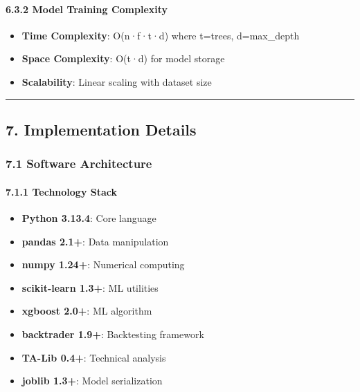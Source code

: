 \paragraph{6.3.2 Model Training
Complexity}\label{model-training-complexity}

\begin{itemize}
\tightlist
\item
  \textbf{Time Complexity}: O(n·f·t·d) where t=trees, d=max\_depth
\item
  \textbf{Space Complexity}: O(t·d) for model storage
\item
  \textbf{Scalability}: Linear scaling with dataset size
\end{itemize}

\begin{center}\rule{0.5\linewidth}{0.5pt}\end{center}

\subsection{7. Implementation Details}\label{implementation-details}

\subsubsection{7.1 Software Architecture}\label{software-architecture}

\paragraph{7.1.1 Technology Stack}\label{technology-stack}

\begin{itemize}
\tightlist
\item
  \textbf{Python 3.13.4}: Core language
\item
  \textbf{pandas 2.1+}: Data manipulation
\item
  \textbf{numpy 1.24+}: Numerical computing
\item
  \textbf{scikit-learn 1.3+}: ML utilities
\item
  \textbf{xgboost 2.0+}: ML algorithm
\item
  \textbf{backtrader 1.9+}: Backtesting framework
\item
  \textbf{TA-Lib 0.4+}: Technical analysis
\item
  \textbf{joblib 1.3+}: Model serialization
\end{itemize}

